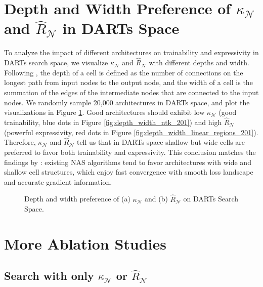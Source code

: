 \documentclass{article} \usepackage{iclr2021_conference,times}
\begin{document}
\section{Depth and Width Preference of $\kappa_\mathcal{N}$ and $\hat{R}_\mathcal{N}$ in DARTs Space}

To analyze the impact of different architectures on trainability and expressivity in DARTs search space, we visualize $\kappa_\mathcal{N}$ and $\hat{R}_\mathcal{N}$ with different depths and width. Following \citet{shu2019understanding},  
the depth of a cell is defined as the number of connections on the longest path from input nodes to the output node, and the width of a cell is the summation of the edges of the intermediate nodes that are connected to the input nodes. We randomly sample 20,000 architectures in DARTs space, and plot the visualizations in Figure \ref{fig:depth_width_201}. Good architectures should exhibit low $\kappa_\mathcal{N}$ (good trainability, blue dots in Figure \ref{fig:depth_width_ntk_201}) and high $\hat{R}_\mathcal{N}$ (powerful expressivity, red dots in Figure \ref{fig:depth_width_linear_regions_201}). Therefore, $\kappa_\mathcal{N}$ and $\hat{R}_\mathcal{N}$ tell us that in DARTs space shallow but wide cells are preferred to favor both trainability and expressivity. This conclusion matches the findings by \citet{shu2019understanding}: existing NAS algorithms tend to favor architectures with wide and shallow cell structures, which enjoy fast convergence with smooth loss landscape and accurate gradient information.

\begin{figure}[h!]
\centering
{}
\caption{Depth and width preference of (a) $\kappa_\mathcal{N}$ and (b) $\hat{R}_\mathcal{N}$ on DARTs Search Space.}
\label{fig:depth_width_201}
\end{figure}

\section{More Ablation Studies}
\subsection{Search with only $\kappa_\mathcal{N}$ or $\hat{R}_\mathcal{N}$}\label{sec:appendix_indicator_option}
\end{document}
